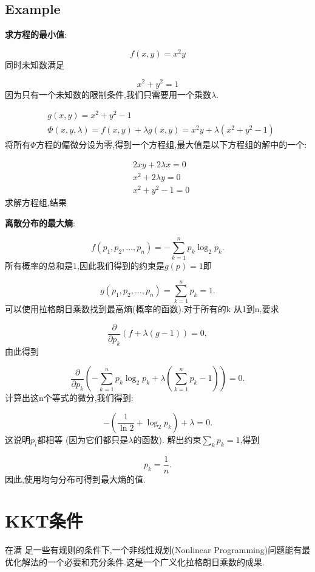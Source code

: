 \documentclass{article}
\begin{document}
\subsection{Example}
\begin{example}
\textbf{求方程的最小值}:

$$ f(x, y) = x^2 y $$
同时未知数满足

$$ x^2 + y^2 = 1 $$
因为只有一个未知数的限制条件,我们只需要用一个乘数$\lambda$.

$$
\begin{aligned}
		& g (x, y) = x^2 +y^2 -1 \\
		& \Phi (x, y, \lambda) = f(x,y) + \lambda g(x, y) = x^2 y + \lambda (x^2 + y^2 - 1)
\end{aligned}
$$
将所有$\Phi$方程的偏微分设为零,得到一个方程组,最大值是以下方程组的解中的一个:

$$
\begin{aligned}
		& 2 x y + 2 \lambda x = 0 \\
		& x^2 + 2 \lambda y = 0 \\
		& x^2 + y^2 -1 = 0
\end{aligned}
$$
求解方程组,结果
\end{example}

\begin{example}
\textbf{离散分布的最大熵}:

$$ f(p_1,p_2,\ldots,p_n) = -\sum_{k=1}^n p_k\log_2 p_k.  $$
所有概率的总和是1,因此我们得到的约束是$g(p)= 1$即

$$ g(p_1,p_2,\ldots,p_n)=\sum_{k=1}^n p_k=1.  $$
可以使用拉格朗日乘数找到最高熵(概率的函数).对于所有的k 从1到n,要求

$$ \frac{\partial}{\partial p_k}(f+\lambda (g-1))=0, $$
由此得到

$$ \frac{\partial}{\partial p_k}\left(-\sum_{k=1}^n p_k \log_2 p_k + \lambda (\sum_{k=1}^n p_k - 1) \right) = 0.  $$
计算出这n个等式的微分,我们得到:

$$ -\left(\frac{1}{\ln 2}+\log_2 p_k \right) + \lambda = 0.  $$
这说明$p_i$都相等 (因为它们都只是$\lambda$的函数). 解出约束$\sum_k p_k = 1$,得到

$$ p_k = \frac{1}{n}.$$
因此,使用均匀分布可得到最大熵的值.
\end{example}

\section{KKT条件}
在满 足一些有规则的条件下,一个非线性规划(Nonlinear Programming)问题能有最优化解法的一个必要和充分条件.这是一个广义化拉格朗日乘数的成果.
\end{document}
